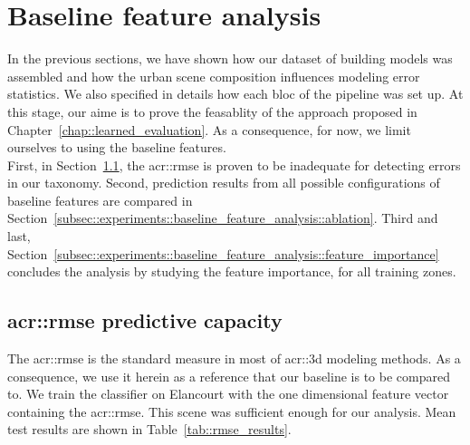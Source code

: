 \section{Baseline feature analysis}
    \label{sec::experiments::baseline_feature_analysis}
    In the previous sections, we have shown how our dataset of building models was assembled and how the urban scene composition influences modeling error statistics.
    We also specified in details how each bloc of the pipeline was set up.
    At this stage, our aime is to prove the feasablity of the approach proposed in Chapter~\ref{chap::learned_evaluation}.
    As a consequence, for now, we limit ourselves to using the baseline features.\\

    First, in Section~\ref{subsec::experiments::baseline_feature_analysis::rmse}, the \gls{acr::rmse} is proven to be inadequate for detecting errors in our taxonomy.
    Second, prediction results from all possible configurations of baseline features are compared in Section~\ref{subsec::experiments::baseline_feature_analysis::ablation}.
    Third and last, Section~\ref{subsec::experiments::baseline_feature_analysis::feature_importance} concludes the analysis by studying the feature importance, for all training zones.

    \subsection{\texorpdfstring{\acrlong*{acr::rmse}}{RMSE} predictive capacity}
        \label{subsec::experiments::baseline_feature_analysis::rmse}
        The \gls{acr::rmse} is the standard measure in most of \gls{acr::3d} modeling methods.
        As a consequence, we use it herein as a reference that our baseline is to be compared to.
        We train the classifier on Elancourt with the one dimensional feature vector containing the \gls{acr::rmse}.
        This scene was sufficient enough for our analysis.
        Mean test results are shown in Table~\ref{tab::rmse_results}.\\

